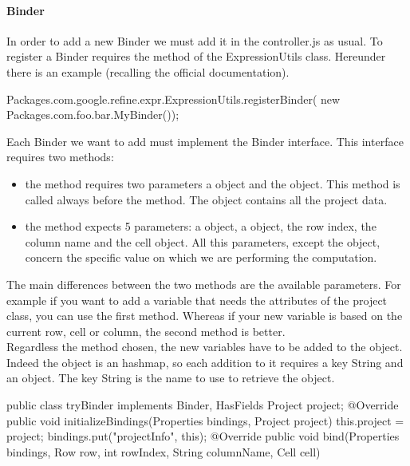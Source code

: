 \paragraph{Binder} In order to add a new Binder we must add it in the controller.js as usual. To register a Binder requires the  method of the ExpressionUtils class. Hereunder there is an example (recalling the official documentation). 
\begin{code}
Packages.com.google.refine.expr.ExpressionUtils.registerBinder(
       new Packages.com.foo.bar.MyBinder());
\end{code}
Each Binder we want to add must implement the Binder interface. This interface requires two methods:
\begin{itemize}
	\item the  method requires two parameters a  object and the  object. This method is called always before the  method. The  object contains all the project data.
	\item the  method expects 5 parameters: a  object, a  object, the row index, the column name and the cell object. All this parameters, except the  object, concern the specific value on which we are performing the computation.
\end{itemize}
The main differences between the two methods are the available parameters. For example if you want to add a variable that needs the attributes of the project class, you can use the first method. Whereas if your new variable is based on the current row, cell or column, the second method is better. \\
Regardless the method chosen, the new variables have to be added to the  object. Indeed the  object is an hashmap, so each addition to it requires a key String and an object. The key String is the name to use to retrieve the object. 
\begin{code}
public class tryBinder implements Binder, HasFields{
Project project;
    @Override
    public void initializeBindings(Properties bindings, 
                                     Project project) {
        this.project = project;
        bindings.put("projectInfo", this);
    }
    @Override
    public void bind(Properties bindings, Row row, 
              int rowIndex, String columnName, Cell cell) {
    }
} 
\end{code}
